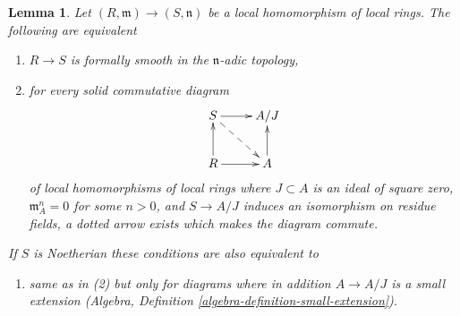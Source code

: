 \documentclass{amsart}
\theoremstyle{plain}
\newtheorem{lemma}[subsection]{Lemma}
\theoremstyle{definition}
\theoremstyle{remark}
\numberwithin{equation}{subsection}
\begin{document}
\begin{lemma}
\label{lemma-fs-local}
Let $(R, \mathfrak m) \to (S, \mathfrak n)$ be a local homomorphism
of local rings. The following are equivalent
\begin{enumerate}
\item $R \to S$ is formally smooth in the $\mathfrak n$-adic topology,
\item for every solid commutative diagram
$$
\xymatrix{
S \ar[r] \ar@{-->}[rd] & A/J \\
R \ar[r] \ar[u] & A \ar[u]
}
$$
of local homomorphisms of local rings where $J \subset A$ is
an ideal of square zero, $\mathfrak m_A^n = 0$ for some $n > 0$, and
$S \to A/J$ induces an isomorphism on residue fields, a dotted
arrow exists which makes the diagram commute.
\end{enumerate}
If $S$ is Noetherian these conditions are also equivalent to
\begin{enumerate}
\item[(3)] same as in (2) but only for diagrams where in addition
$A \to A/J$ is a small extension
(Algebra, Definition \ref{algebra-definition-small-extension}).
\end{enumerate}
\end{lemma}
\end{document}
